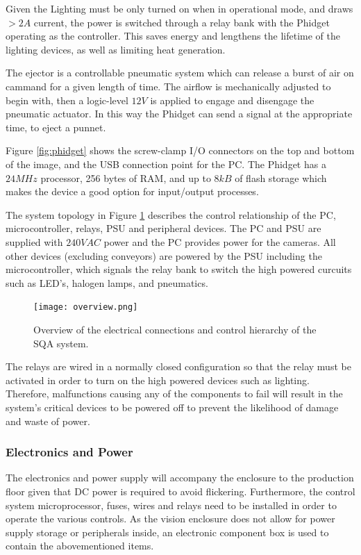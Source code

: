 \documentclass[fleqn,twoside]{article}
\begin{document}
Given the Lighting must be only turned on when in operational mode, and draws $>2A$ current, the power is switched through a relay bank with the Phidget operating as the controller. This saves energy and lengthens the lifetime of the lighting devices, as well as limiting heat generation.

The ejector is a controllable pneumatic system which can release a burst of air on cammand for a given length of time. The airflow is mechanically adjusted to begin with, then a logic-level $12V$ is applied to engage and disengage the pneumatic actuator. In this way the Phidget can send a signal at the appropriate time, to eject a punnet.


Figure \ref{fig:phidget} shows the screw-clamp I/O connectors on the top and bottom of the image, and the USB connection point for the PC. The Phidget has a $24MHz$ processor, 256 bytes of RAM, and up to $8kB$ of flash storage which makes the device a good option for input/output processes.
 


The system topology in Figure \ref{fig:overview} describes the control relationship of the PC, microcontroller, relays, PSU and peripheral devices. The PC and PSU are supplied with $240VAC$ power and the PC provides power for the cameras. All other devices (excluding conveyors) are powered by the PSU including the microcontroller, which signals the relay bank to switch the high powered curcuits such as LED's, halogen lamps, and pneumatics. 


\begin{figure}[h]
	\centering
	\texttt{[image: overview.png]}
	\caption{Overview of the electrical connections and control hierarchy of the SQA system.}
	\label{fig:overview}
\end{figure} 

The relays are wired in a normally closed configuration so that the relay must be activated in order to turn on the high powered devices such as lighting. Therefore, malfunctions causing any of the components to fail will result in the system's critical devices to be powered off to prevent the likelihood of damage and waste of power.


\subsubsection{Electronics and Power}

The electronics and power supply will accompany the enclosure to the production floor given that DC power is required to avoid flickering. Furthermore, the control system microprocessor, fuses, wires and relays need to be installed in order to operate the various controls. As the vision enclosure does not allow for power supply storage or peripherals inside, an electronic component box is used to contain the abovementioned items. 
\end{document}
